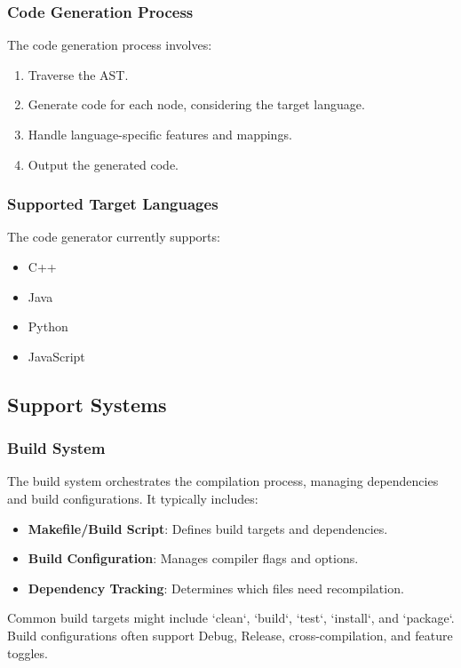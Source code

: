 \documentclass[conference]{IEEEtran}
\begin{document}
\subsubsection{Code Generation Process}
The code generation process involves:
\begin{enumerate}
    \item Traverse the AST.
    \item Generate code for each node, considering the target language.
    \item Handle language-specific features and mappings. %
    \item Output the generated code.
\end{enumerate}

\subsubsection{Supported Target Languages} %
The code generator currently supports: %
\begin{itemize}
    \item C++
    \item Java
    \item Python
    \item JavaScript %
\end{itemize}

\subsection{Support Systems}

\subsubsection{Build System}
The build system orchestrates the compilation process, managing dependencies and build configurations. It typically includes: %
\begin{itemize}
    \item \textbf{Makefile/Build Script}: Defines build targets and dependencies.
    \item \textbf{Build Configuration}: Manages compiler flags and options.
    \item \textbf{Dependency Tracking}: Determines which files need recompilation.
\end{itemize}
Common build targets might include `clean`, `build`, `test`, `install`, and `package`. Build configurations often support Debug, Release, cross-compilation, and feature toggles.
\end{document}
